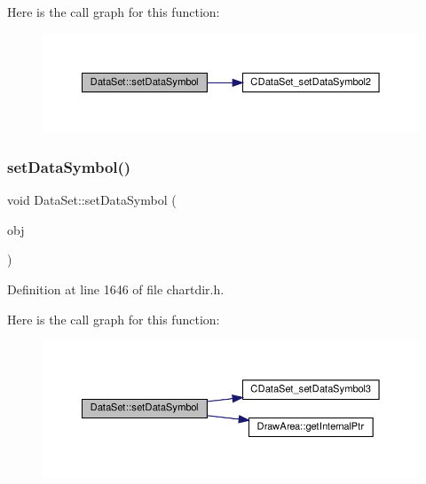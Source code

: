 Here is the call graph for this function\+:
\nopagebreak
\begin{figure}[H]
\begin{center}
\leavevmode
\includegraphics[width=350pt]{class_data_set_ab14487760622f6bd001c2dda7bb90e95_cgraph}
\end{center}
\end{figure}
\mbox{\label{class_data_set_a913fa7d64fdda81c223a087fdf385465}} 
\subsubsection{\texorpdfstring{set\+Data\+Symbol()}{setDataSymbol()}\hspace{0.1cm}{\footnotesize\ttfamily [3/4]}}
{\footnotesize\ttfamily void Data\+Set\+::set\+Data\+Symbol (\begin{DoxyParamCaption}\item[{const \hyperlink{class_draw_area}{Draw\+Area} $\ast$}]{obj }\end{DoxyParamCaption})\hspace{0.3cm}{\ttfamily [inline]}}



Definition at line 1646 of file chartdir.\+h.

Here is the call graph for this function\+:
\nopagebreak
\begin{figure}[H]
\begin{center}
\leavevmode
\includegraphics[width=350pt]{class_data_set_a913fa7d64fdda81c223a087fdf385465_cgraph}
\end{center}
\end{figure}
\mbox{\label{class_data_set_a5950da227229ddc6e9bc900830525f9e}} 
